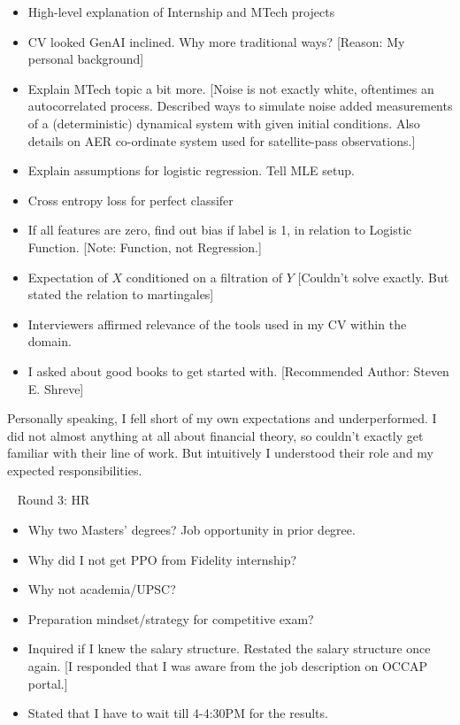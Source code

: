\documentclass[12pt]{article}
\begin{document}
\begin{itemize}
    \item High-level explanation of Internship and MTech projects
    \item CV looked GenAI inclined. Why more traditional ways? [Reason: My personal background]
    \item Explain MTech topic a bit more. [Noise is not exactly white, oftentimes an autocorrelated process. Described ways to simulate noise added measurements of a (deterministic) dynamical system with given initial conditions. Also details on AER co-ordinate system used for satellite-pass observations.]
    \item Explain assumptions for logistic regression. Tell MLE setup.
    \item Cross entropy loss for perfect classifer
    \item If all features are zero, find out bias if label is 1, in relation to Logistic Function. [Note: Function, not Regression.]
    \item Expectation of $X$ conditioned on a filtration of $Y$ [Couldn't solve exactly. But stated the relation to martingales]
    \item Interviewers affirmed relevance of the tools used in my CV within the domain.
    \item I asked about good books to get started with. [Recommended Author: Steven E. Shreve]
\end{itemize}

Personally speaking, I fell short of my own expectations and underperformed. I did not almost anything at all about financial theory, so couldn't exactly get familiar with their line of work. But intuitively I understood their role and my expected responsibilities. 


\vspace{15pt}\
\newline
Round 3: HR

\begin{itemize}
    \item Why two Masters' degrees? Job opportunity in prior degree.
    \item Why did I not get PPO from Fidelity internship?
    \item Why not academia/UPSC? 
    \item Preparation mindset/strategy for competitive exam?
    \item Inquired if I knew the salary structure. Restated the salary structure once again. [I responded that I was aware from the job description on OCCAP portal.]
    \item Stated that I have to wait till 4-4:30PM for the results.
\end{itemize}
\end{document}
